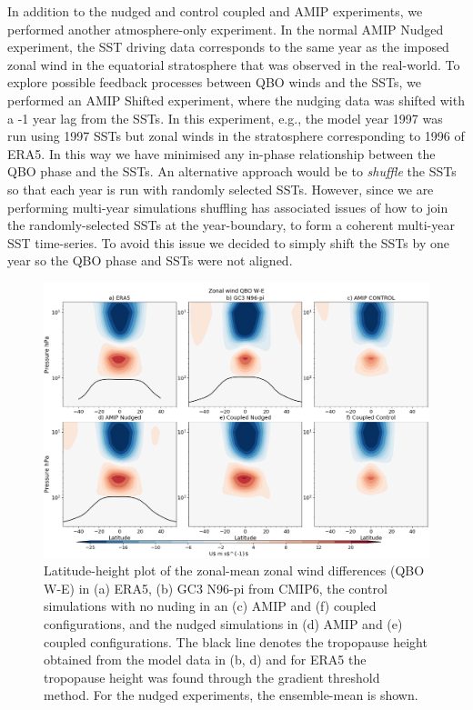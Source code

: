 In addition to the nudged and control coupled and AMIP experiments, we performed another atmosphere-only experiment. In the normal AMIP Nudged experiment, the SST driving data corresponds to the same year as the imposed zonal wind in the equatorial stratosphere that was observed in the real-world. To explore possible feedback processes between QBO winds and the SSTs, we performed an AMIP Shifted experiment, where the nudging data was shifted with a -1 year lag from the SSTs. In this experiment, e.g., the model year 1997 was run using 1997 SSTs but zonal winds in the stratosphere corresponding to 1996 of ERA5. In this way we have minimised any in-phase relationship between the QBO phase and the SSTs. An alternative approach would be to \textit{shuffle} the SSTs so that each year is run with randomly selected SSTs. However, since we are performing multi-year simulations shuffling has associated issues of how to join the randomly-selected SSTs at the year-boundary, to form a coherent multi-year SST time-series. To avoid this issue we decided to simply shift the SSTs by one year so the QBO phase and SSTs were not aligned.  


\begin{figure}[t!]
\centering
 \includegraphics[width=\linewidth]{figures/zonalplotx_wind.png}
\caption[Zonal mean zonal wind QBO difference]{Latitude-height plot of the zonal-mean zonal wind differences (QBO W-E) in (a) ERA5, (b) GC3 N96-pi from CMIP6, the control simulations with no nuding in an (c) AMIP and (f) coupled configurations, and the nudged simulations in (d) AMIP and (e) coupled configurations. The black line denotes the tropopause height obtained from the model data in (b, d) and for ERA5 the tropopause height was found through the gradient threshold method. For the nudged experiments, the ensemble-mean is shown. }
\label{fig:zonal_u}
\end{figure}

